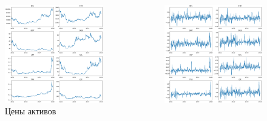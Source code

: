 \documentclass{beamer}
\begin{document}
\begin{frame}
    \begin{columns}
        \begin{column}{0.5\textwidth}
            \begin{figure}
                \centering
                \includegraphics[width=1\textwidth]{prices.png}
                \caption{Цены активов}
                \label{fig:prices}
            \end{figure}
        \end{column}
        \begin{column}{0.5\textwidth}
            \begin{figure}
                \centering
                \includegraphics[width=1\textwidth]{returns.png}

\end{figure}
\end{column}
\end{columns}
\end{frame}
\end{document}
